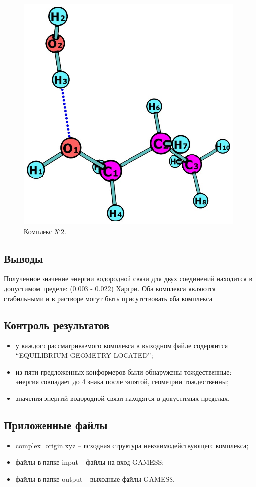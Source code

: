 \begin{figure}[H]
\centering
\captionsetup{justification=centering}
\includegraphics[scale=0.3]{fig/3.jpg}
\caption{Комплекс №2.}
\end{figure}


\subsection{Выводы}
Полученное значение энергии водородной связи для двух соединений находится в допустимом пределе: (0.003 - 0.022) Хартри. Оба комплекса являются стабильными и в растворе могут быть присутствовать оба комплекса.


\subsection{Контроль результатов}

\begin{itemize}
    \item у каждого рассматриваемого комплекса в выходном файле содержится “EQUILIBRIUM GEOMETRY LOCATED”;
    \item из пяти предложенных конформеров были обнаружены тождественные: энергия совпадает до 4 знака после запятой, геометрии тождественны; 
    \item значения энергий водородной связи находятся в допустимых пределах.
\end{itemize}{}


\subsection{Приложенные файлы}
\begin{itemize}
    \item complex\_origin.xyz – исходная структура невзаимодействующего комплекса;
    \item файлы в папке input – файлы на вход GAMESS;
    \item файлы в папке output – выходные файлы GAMESS.
\end{itemize}{}